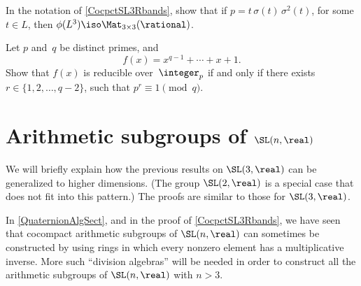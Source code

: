 \begin{exercises}
\item \label{phi(L3)=Mat}
In the notation of \cref{CocpctSL3Rbands}, show that if 
$p = t \, \sigma(t) \, \sigma^2(t)$, for some $t \in
L$, then $\phi(L^3) \iso \Mat_{3 \times 3}(\rational)$.

\item \label{CycloqRedModp}
 Let $p$ and~$q$ be distinct primes, and
 $$f(x) = x^{q-1} + \cdots + x + 1 .$$
 Show that $f(x)$ is reducible over~$\integer_p$ if and
only if there exists $r \in \{1,2,\ldots, q-2\}$, such that
$p^r \equiv 1 \pmod{q}$.

\end{exercises}










\section{Arithmetic subgroups of \texorpdfstring{$\SL(\lowercase{n},\real)$}{SL(n,R)}} \label{LattSlnRSect}

We will briefly explain how the previous results on $\SL(3,\real)$
can be generalized to higher dimensions. (The group $\SL(2,\real)$
is a special case that does not fit into this pattern.)
The proofs are similar to those for $\SL(3,\real)$.

In \cref{QuaternionAlgSect}, and in the proof of \cref{CocpctSL3Rbands}, we have seen that cocompact arithmetic subgroups of $\SL(n,\real)$ can sometimes be constructed by using rings in which every nonzero element has a multiplicative inverse. More such ``division algebras'' will be needed in order to construct all the arithmetic subgroups of $\SL(n,\real)$ with $n > 3$. 



